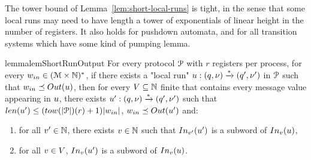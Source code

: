 \begin{remark}
	The tower bound of Lemma~\ref{lem:short-local-runs} is tight, in the sense that some local runs may need to have length a tower of exponentials of linear height in the number of registers.
	It also holds for pushdown automata, and for all transition systems which have some kind of pumping lemma.
\end{remark}


\begin{restatable}{lemma}{lemShortRunOutput}
	\label{lem:short-run-for-output}
	For every protocol $\mathcal{P}$ with $r$ registers per process, for every $w_{in} \in (\mathcal{M}\times \mathbb{N})^*$, if there exists a "local run" $u: (q, \nu) \xrightarrow{*} (q', \nu')$ in $\mathcal{P}$ such that $w_{in} \subword \Output{\localrun}$, then for every $V \subseteq \mathbb{N}$ finite that contains every message value appearing in $u$, there exists $u': (q, \nu) \xrightarrow{*} (q', \nu')$ such that $\length{\localrun'} \leq (\towerfun(\size{\prot})(r)+1)\size{w_{in}}$, $w_{in} \subword \Output{\localrun'}$ and:
	
	\begin{enumerate}
		\item for all $v' \in \mathbb{N}$, there exists $v \in \mathbb{N}$ such that $\vinput{\aval'}{\localrun'}$ is a subword of $\vinput{\aval}{\localrun}$,
		\item for all $v \in V$, $\vinput{\aval}{\localrun'}$ is a subword of $\vinput{\aval}{\localrun}$. 
	\end{enumerate}
\end{restatable}


